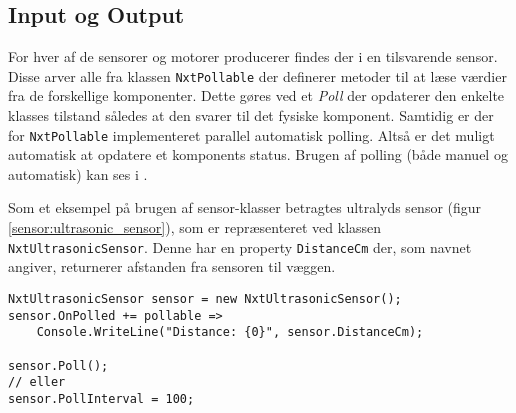 \subsection{Input og Output}
For hver af de sensorer og motorer \lego producerer findes der i \mindsqualls en tilsvarende sensor.
Disse arver alle fra klassen \lstinline[style=csharp]!NxtPollable! der definerer metoder til at læse værdier fra de forskellige komponenter.
Dette gøres ved et \emph{Poll} der opdaterer den enkelte klasses tilstand således at den svarer til det fysiske komponent.
Samtidig er der for \lstinline[style=csharp]!NxtPollable! implementeret parallel automatisk polling.
Altså er det muligt automatisk at opdatere et komponents status.
Brugen af polling (både manuel og automatisk) kan ses i .

Som et eksempel på brugen af sensor-klasser betragtes \legos ultralyds sensor (figur \ref{sensor:ultrasonic_sensor}), som er repræsenteret ved klassen \lstinline[style=csharp]!NxtUltrasonicSensor!.
Denne har en property \lstinline[style=csharp]!DistanceCm! der, som navnet angiver, returnerer afstanden fra sensoren til væggen.

\begin{lstlisting}[style=csharp,caption={Et eksempel på polling i \mindsqualls},label=mindsqualls:polling]
NxtUltrasonicSensor sensor = new NxtUltrasonicSensor();
sensor.OnPolled += pollable =>
    Console.WriteLine("Distance: {0}", sensor.DistanceCm);

sensor.Poll();
// eller
sensor.PollInterval = 100;
\end{lstlisting}